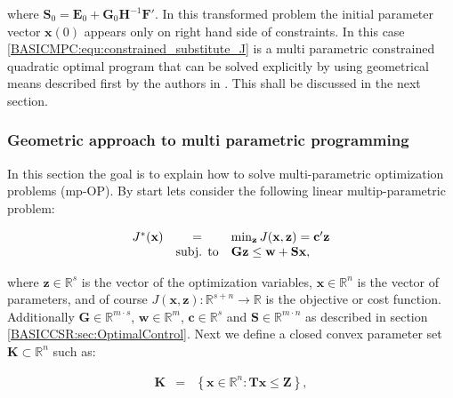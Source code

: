     where $\textbf{S}_0=\textbf{E}_0+\textbf{G}_0\textbf{H}^{-1}\textbf{F}'$. In this transformed problem the initial parameter vector $\textbf{x}(0)$ appears only on right hand side of constraints. In this case \ref{BASICMPC:equ:constrained_substitute_J} is a multi parametric constrained quadratic optimal program that can be solved explicitly by using geometrical means described first by the authors in \cite{bemporad2002explicit}. This shall be discussed in the next section.

    \subsubsection{Geometric approach to multi parametric programming}\label{BASICCSR:sec:MPP}

    In this section the goal is to explain how to solve multi-parametric optimization problems (mp-OP). By start lets consider the following linear multip-parametric problem:

        \begin{equation}
    \begin{array}{rcl}
            J^*(\textbf{x})&=&\min_{\textbf{z}}J(\textbf{x},\textbf{z})=\textbf{c}'\textbf{z}\\
            &\textnormal{subj. to}&\textbf{Gz}\leq\textbf{w}+\textbf{Sx},
        \end{array}
        \label{BASICMPC:equ:MPP_program}
    \end{equation}

    where $\textbf{z}\in\mathbb{R}^s$ is the vector of the optimization variables,  $\textbf{x}\in\mathbb{R}^n$ is the vector of parameters, and of course $J(\textbf{x},\textbf{z}):\mathbb{R}^{s+n}\rightarrow\mathbb{R}$ is the objective or cost function. Additionally $\textbf{G}\in\mathbb{R}^{m\cdot s}$, $\textbf{w}\in\mathbb{R}^m$, $\textbf{c}\in\mathbb{R}^s$ and $\textbf{S}\in\mathbb{R}^{m\cdot n}$ as described in section \ref{BASICCSR:sec:OptimalControl}. Next we define a closed convex parameter set $\textbf{K}\subset\mathbb{R}^n$ such as:

    \begin{equation}
    \begin{array}{rcl}
            \textbf{K}&=&\left\{ \textbf{x}\in\mathbb{R}^n:\textbf{Tx}\leq\textbf{Z}\right\},
        \end{array}
        \label{BASICMPC:equ:MPP_parameterset}
    \end{equation}

